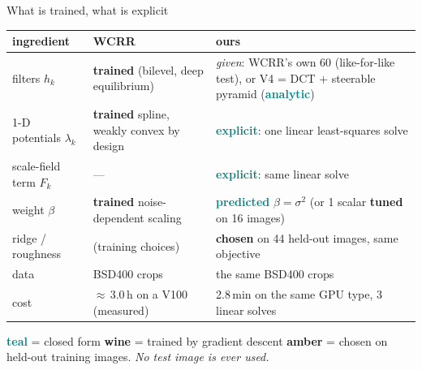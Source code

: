 \documentclass[10pt,aspectratio=169]{beamer}
\newcommand{\EXP}[1]{\textcolor{teal}{\textbf{#1}}}
\newcommand{\TRN}[1]{\textcolor{wine}{\textbf{#1}}}
\newcommand{\HLD}[1]{\textcolor{amber}{\textbf{#1}}}
\begin{document}
\begin{frame}{What is trained, what is explicit}
\centering
\renewcommand{\arraystretch}{1.12}
\footnotesize
\begin{tabular}{@{}p{2.6cm}p{4.3cm}p{6.1cm}@{}}
\toprule
ingredient & WCRR & ours\\\midrule
filters $h_k$ & \TRN{trained} (bilevel, deep equilibrium) &
  \emph{given}: WCRR's own 60 (like-for-like test), or V4 = DCT + steerable pyramid (\EXP{analytic})\\
1-D potentials $\lambda_k$ & \TRN{trained} spline, weakly convex by design & \EXP{explicit}: one linear least-squares solve\\
scale-field term $F_k$ & --- & \EXP{explicit}: same linear solve\\
weight $\beta$ & \TRN{trained} noise-dependent scaling & \EXP{predicted} $\beta=\sigma^2$ (or 1 scalar \HLD{tuned} on 16 images)\\
ridge / roughness & (training choices) & \HLD{chosen} on 44 held-out images, same objective\\
data & BSD400 crops & the same BSD400 crops\\
cost & $\approx$\,3.0\,h on a V100 (measured) & 2.8\,min on the same GPU type, 3 linear solves\\
\bottomrule
\end{tabular}

\medskip
\EXP{teal} = closed form \quad \TRN{wine} = trained by gradient descent \quad
\HLD{amber} = chosen on held-out training images. \emph{No test image is ever used.}
\end{frame}
\end{document}
